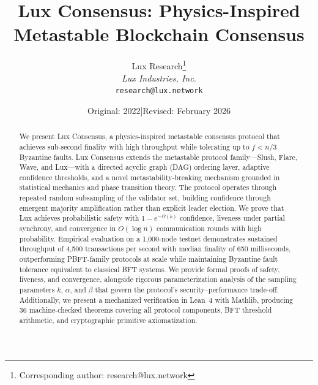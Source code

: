 \documentclass[11pt,a4paper]{article}
\title{\textbf{Lux Consensus: Physics-Inspired Metastable Blockchain Consensus}}
\author{
Lux Research\thanks{Corresponding author: research@lux.network}\\
\textit{Lux Industries, Inc.}\\
\texttt{research@lux.network}
}
\date{Original: 2022\quad|\quad Revised: February 2026}
\begin{document}
\luxcoverpage

\begin{abstract}
We present Lux Consensus, a physics-inspired metastable consensus protocol that achieves
sub-second finality with high throughput while tolerating up to $f < n/3$ Byzantine faults.
Lux Consensus extends the metastable protocol family---Slush, Flare, Wave, and
Lux---with a directed acyclic graph (DAG) ordering layer, adaptive confidence
thresholds, and a novel metastability-breaking mechanism grounded in statistical mechanics
and phase transition theory. The protocol operates through repeated random subsampling of
the validator set, building confidence through emergent majority amplification rather than
explicit leader election. We prove that Lux achieves probabilistic safety with $1 - e^{-\Omega(k)}$
confidence, liveness under partial synchrony, and convergence in $O(\log n)$ communication
rounds with high probability. Empirical evaluation on a 1,000-node testnet demonstrates
sustained throughput of 4,500 transactions per second with median finality of 650
milliseconds, outperforming PBFT-family protocols at scale while maintaining Byzantine fault
tolerance equivalent to classical BFT systems. We provide formal proofs of safety, liveness,
and convergence, alongside rigorous parameterization analysis of the sampling parameters
$k$, $\alpha$, and $\beta$ that govern the protocol's security--performance trade-off.
Additionally, we present a mechanized verification in Lean~4 with Mathlib, producing
36 machine-checked theorems covering all protocol components, BFT threshold arithmetic,
and cryptographic primitive axiomatization.
\end{abstract}

\tableofcontents
\newpage













\end{document}

